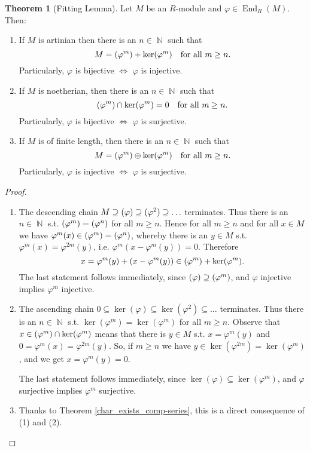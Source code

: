 \documentclass[12pt,a4paper]{report}
\theoremstyle{definition}
\newtheorem{theorem}{Theorem}[chapter] %
\theoremstyle{num.custom-title}
\let\o\relax %
\DeclareMathOperator{\o}{\mathsf{o}}
\let\Im\relax %
\DeclareMathOperator{\Im}{Im}
\DeclareMathOperator{\End}{End}
\DeclareMathOperator{\N}{\mathbb{N}}
\DeclareMathOperator{\sse}{\subseteq}
\renewcommand{\phi}{\varphi}
\renewcommand{\iff}{\Leftrightarrow}
\begin{document}
\begin{theorem}[Fitting Lemma]\label{fitt-lemma}
Let $M$ be an $R$-module and $\phi \in \End_R(M)$. Then:
\begin{enumerate}
\item If $M$ is artinian then there is an $n \in \N$ such that
\[
M = \Im(\phi^m)+\ker(\phi^m) \quad \text{for all } m \geq n.
\]
Particularly, $\phi$ is bijective $\iff$ $\phi$ is injective.
\item If $M$ is noetherian, then there is an $n \in \N$ such that
\[
\Im(\phi^m) \cap \ker(\phi^m) = 0 \quad \text{for all } m \geq n.
\]
Particularly, $\phi$ is bijective $\iff$ $\phi$ is surjective.
\item If $M$ is of finite length, then there is an $n \in \N$ such that
\[
M = \Im(\phi^m) \oplus \ker(\phi^m) \quad \text{for all } m \geq n.
\]
Particularly, $\phi$ is injective $\iff$ $\phi$ is surjective.
\end{enumerate}
\begin{proof}\ 
\begin{enumerate}
\item The descending chain $M \supseteq \Im(\phi) \supseteq \Im(\phi^2) \supseteq \ldots$ terminates. Thus there is an $n \in \N$ s.t. $\Im(\phi^m)=\Im(\phi^n)$ for all $m \geq n$. Hence for all $m \geq n$ and for all $x \in M$ we have $\phi^m(x) \in \Im(\phi^m)=\Im(\phi^n)$, whereby there is an $y \in M$ s.t. $\phi^m(x)=\phi^{2m}(y)$, i.e. $\phi^m(x-\phi^m(y))=0$. Therefore
\[
x = \phi^m(y) + (x-\phi^m(y)) \in \Im(\phi^m)+\ker(\phi^m).
\]
The last statement follows immediately, since $\Im(\phi) \supseteq \Im(\phi^m)$, and $\phi$ injective implies $\phi^m$ injective.
\item The ascending chain $0 \sse \ker(\phi) \sse \ker (\phi^2) \sse \ldots$ terminates. Thus there is an $n \in \N$ s.t. $\ker(\phi^m)=\ker(\phi^m)$  for all $m \geq n$. Observe that $x \in \Im(\phi^m) \cap \ker(\phi^m)$ means that there is $y \in M$ s.t. $x = \phi^m(y)$ and $0 = \phi^m(x) = \phi^{2m}(y)$. So, if $m \geq n$ we have $y \in \ker(\phi^{2m})=\ker(\phi^m)$, and we get $x = \phi^m(y)=0$. 

The last statement follows immediately, since $\ker(\phi) \sse \ker(\phi^m)$, and $\phi$ surjective implies $\phi^m$ surjective.
\item Thanks to Theorem \ref{char_exists_comp-series}, this is a direct consequence of (1) and (2).
\end{enumerate}
\end{proof}
\end{theorem}
\end{document}
